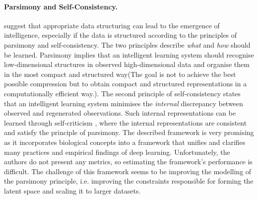 \paragraph{Parsimony and Self-Consistency.}  suggest that appropriate data structuring can lead to the emergence of intelligence, especially if the data is structured according to the principles of parsimony and self-consistency. The two principles describe \emph{what} and \emph{how} should be learned. Parsimony implies that an intelligent learning system should recognise low-dimensional structures in observed high-dimensional data and organise them in the most compact and structured way\sidenote(The goal is not to achieve the best possible compression but to obtain compact and structured representations in a computationally efficient way.). The second principle of self-consistency states that an intelligent learning system minimises the \emph{internal} discrepancy between observed and regenerated observations. Such internal representations can be learned through self-criticism , where the internal representations are consistent and satisfy the principle of parsimony. The described framework is very promising as it incorporates biological concepts into a framework that unifies and clarifies many practices and empirical findings of deep learning.
Unfortunately, the authors do not present any metrics, so estimating the framework's performance is difficult.
The challenge of this framework seems to be improving the modelling of the parsimony principle, i.e. improving the constraints responsible for forming the latent space and scaling it to larger datasets.

